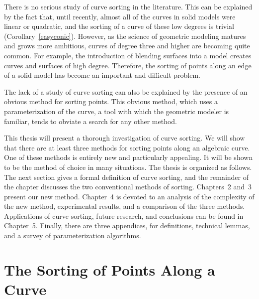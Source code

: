 There is no serious study of curve sorting in the literature.
This can be explained by the fact that,
until recently, almost all of the curves in solid models were linear
or quadratic, and the sorting of a curve of these low degrees is 
trivial (Corollary~\ref{easyconic}).
However, as the science of geometric modeling matures and grows more
ambitious, curves of degree three and higher are becoming quite common.
For example, the introduction of blending surfaces
into a model creates curves and surfaces of high degree.
Therefore, the sorting of points along an edge of a solid model has become
an important and difficult problem.

The lack of a study of curve sorting can also be explained 
by the presence of an obvious method for sorting points.
This obvious method, which uses a parameterization of the curve, a tool
with which the geometric modeler is familiar, tends to obviate a
search for any other method.

This thesis will present a thorough investigation of curve sorting.
We will show that there are at least three methods for sorting
points along an algebraic curve.
One of these methods is entirely new and particularly appealing.
It will be shown to be the method of choice in many situations.
The thesis is organized as follows.
The next section gives a formal definition of curve sorting, and the
remainder of the chapter discusses the two conventional methods of
sorting.
Chapters~2 and~3 present our new method.
Chapter~4 is devoted to an analysis of the complexity of the new
method, experimental results, and a comparison of the three methods.
Applications of curve sorting, future research, and conclusions can
be found in Chapter~5.
Finally, there are three appendices, for definitions, technical lemmas,
and a survey of parameterization algorithms.
%
\section{The Sorting of Points Along a Curve}
\label{a-chap1-sec}

